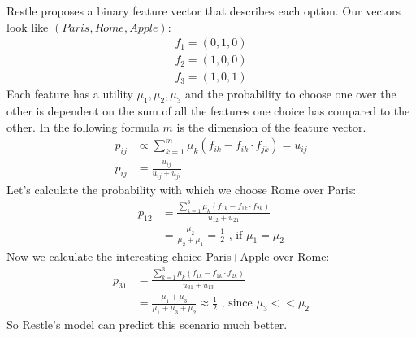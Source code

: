 \documentclass[../main/Notes.tex]{subfiles}
\begin{document}
Restle proposes a binary feature vector that describes each option. Our vectors look like $(Paris,Rome,Apple)$:
\begin{align*}
f_1 = (0,1,0)\\
f_2 = (1,0,0)\\
f_3 = (1,0,1)
\end{align*}
Each feature has a utility $\mu_1,\mu_2,\mu_3$ and the probability to choose one over the other is dependent on the sum of all the features one choice has compared to the other. In the following formula $m$ is the dimension of the feature vector.
\begin{align*}
p_{ij} &\propto \sum_{k=1}^{m}\mu_k(f_{ik}-f_{ik}\cdot f_{jk}) = u_{ij}\\
p_{ij} &= \frac{u_{ij}}{u_{ij}+u_{ji}}
\end{align*}
Let's calculate the probability with which we choose Rome over Paris:
\begin{align*}
p_{12} &= \frac{\sum_{k=1}^3\mu_k(f_{1k}-f_{1k} \cdot f_{2k})}{u_{12}+u_{21}}\\
       &= \frac{\mu_2}{\mu_2+\mu_1} = \frac{1}{2} \text{ , if $\mu_1=\mu_2$}
\end{align*}
Now we calculate the interesting choice Paris+Apple over Rome:
\begin{align*}
p_{31} &= \frac{\sum_{k=1}^3\mu_k(f_{1k}-f_{1k} \cdot f_{2k})}{u_{31}+u_{13}}\\
       &= \frac{\mu_1+\mu_3}{\mu_1+\mu_3+\mu_2} \approx \frac{1}{2} \text{ , since $\mu_3 << \mu_2$}
\end{align*}
So Restle's model can predict this scenario much better.
\end{document}
